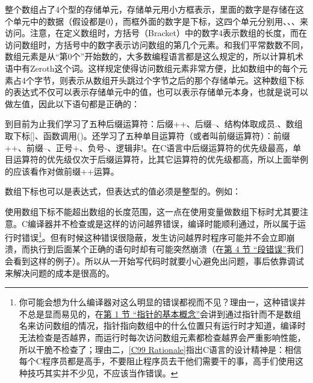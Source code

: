 整个数组占了4个型的存储单元，存储单元用小方框表示，里面的数字是存储在这个单元中的数据（假设都是0），而框外面的数字是下标，这四个单元分别用、、、来访问。注意，在定义数组时，方括号（Bracket）中的数字4表示数组的长度，而在访问数组时，方括号中的数字表示访问数组的第几个元素。和我们平常数数不同，数组元素是从“第0个”开始数的，大多数编程语言都是这么规定的，所以计算机术语中有Zeroth这个词。这样规定使得访问数组元素非常方便，比如数组中的每个元素占4个字节，则表示从数组开头跳过个字节之后的那个存储单元。这种数组下标的表达式不仅可以表示存储单元中的值，也可以表示存储单元本身，也就是说可以做左值，因此以下语句都是正确的：




到目前为止我们学习了五种后缀运算符：后缀++、后缀--、结构体取成员.、数组取下标[]、函数调用()。还学习了五种单目运算符（或者叫前缀运算符）：前缀++、前缀--、正号+、负号-、逻辑非!。在C语言中后缀运算符的优先级最高，单目运算符的优先级仅次于后缀运算符，比其它运算符的优先级都高，所以上面举例的应该看作对做前缀++运算。



数组下标也可以是表达式，但表达式的值必须是整型的。例如：




使用数组下标不能超出数组的长度范围，这一点在使用变量做数组下标时尤其要注意。C编译器并不检查或是这样的访问越界错误，编译时能顺利通过，所以属于运行时错误\footnote[17]{你可能会想为什么编译器对这么明显的错误都视而不见？理由一，这种错误并不总是显而易见的，在\hyperlink{db.ch23s01.id2809880}{第 1 节 “指针的基本概念”}会讲到通过指针而不是数组名来访问数组的情况，指针指向数组中的什么位置只有运行时才知道，编译时无法检查是否越界，而运行时每次访问数组元素都检查越界会严重影响性能，所以干脆不检查了；理由二，\hyperlink{db.bi01.bibli.rationale}{[C99 Rationale]}指出C语言的设计精神是：相信每个C程序员都是高手，不要阻止程序员去干他们需要干的事，高手们使用这种技巧其实并不少见，不应该当作错误。}。但有时候这种错误很隐蔽，发生访问越界时程序可能并不会立即崩溃，而执行到后面某个正确的语句时却有可能突然崩溃（在\hyperlink{db.ch10s04.id2742403}{第 4 节 “段错误”}我们会看到这样的例子）。所以从一开始写代码时就要小心避免出问题，事后依靠调试来解决问题的成本是很高的。



